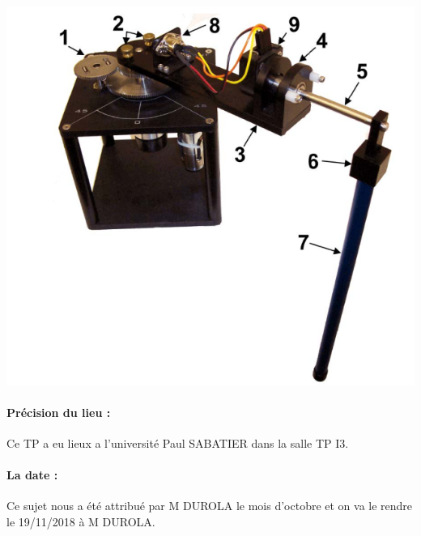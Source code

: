 \documentclass[12pt, a4paper, openany]{report}
\begin{document}
\begin{center}
\includegraphics[scale=0.5]{pondule.png}
\label{fig1} 
\end{center}

\paragraph{Précision du lieu :} Ce TP a eu lieux a l’université Paul SABATIER dans la salle TP I3.   

\paragraph{La date :} Ce sujet nous a été attribué par M DUROLA le mois d'octobre  et on va le rendre le 19/11/2018 à M DUROLA.
\end{document}
